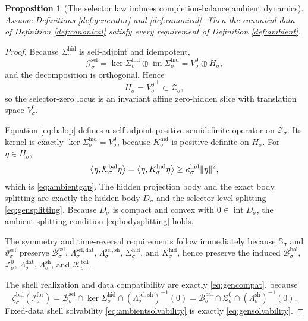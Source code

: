\documentclass[11pt]{article}
\newcommand{\ForSpace}[1]{\mathcal I_{#1}^{\mathrm{for}}}
\newcommand{\BalSpace}[1]{\mathcal Z_{#1}}
\newcommand{\BalBody}[1]{\mathcal B_{#1}^{\mathrm{bal}}}
\newcommand{\BalData}[1]{\Lambda_{#1}^{\mathrm{dat}}}
\newcommand{\BalShell}[1]{\Lambda_{#1}^{\mathrm{sh}}}
\newcommand{\ZeroHiddenSlice}[1]{\mathcal Z_{#1}^{0}}
\newcommand{\ZeroHiddenVec}[1]{V_{#1}^{0}}
\newcommand{\BalOp}[1]{\mathcal K_{#1}^{\mathrm{bal}}}
\newcommand{\BalEmbed}[1]{\zeta_{#1}^{\mathrm{bal}}}
\newcommand{\GapSpace}[1]{H_{#1}}
\newcommand{\GapBody}[1]{D_{#1}}
\newcommand{\HiddenOperator}[1]{K_{#1}^{\mathrm{hid}}}
\newcommand{\GenSpace}[1]{\mathcal G_{#1}^{\mathrm{sel}}}
\newcommand{\GenBody}[1]{\mathcal B_{#1}^{\mathrm{sel}}}
\newcommand{\GenData}[1]{\Lambda_{#1}^{\mathrm{sel,dat}}}
\newcommand{\GenShell}[1]{\Lambda_{#1}^{\mathrm{sel,sh}}}
\newcommand{\HiddenSel}[1]{\Sigma_{#1}^{\mathrm{hid}}}
\newcommand{\GenSym}[1]{\mathbb S_{#1}}
\newcommand{\GenTime}[1]{\vartheta_{#1}^{\mathrm{sel}}}
\newtheorem{proposition}{Proposition}
\begin{document}
\begin{proposition}[The selector law induces completion-balance ambient dynamics]
\label{prop:ambient}
Assume Definitions \ref{def:generator} and \ref{def:canonical}. Then the canonical data of Definition \ref{def:canonical} satisfy every requirement of Definition \ref{def:ambient}.
\end{proposition}

\begin{proof}
Because \(\HiddenSel{\sigma}\) is self-adjoint and idempotent,
\[
\GenSpace{\sigma}
=
\ker\HiddenSel{\sigma}\oplus \operatorname{im}\HiddenSel{\sigma}
=
\ZeroHiddenVec{\sigma}\oplus\GapSpace{\sigma},
\]
and the decomposition is orthogonal. Hence
\[
\GapSpace{\sigma}
=
{\ZeroHiddenVec{\sigma}}^{\perp}\subset\BalSpace{\sigma},
\]
so the selector-zero locus is an invariant affine zero-hidden slice with translation space \(\ZeroHiddenVec{\sigma}\).

Equation \eqref{eq:balop} defines a self-adjoint positive semidefinite operator on \(\BalSpace{\sigma}\). Its kernel is exactly \(\ker\HiddenSel{\sigma}=\ZeroHiddenVec{\sigma}\), because \(\HiddenOperator{\sigma}\) is positive definite on \(\GapSpace{\sigma}\). For \(\eta\in\GapSpace{\sigma}\),
\[
\ev{\eta,\BalOp{\sigma}\eta}
=
\ev{\eta,\HiddenOperator{\sigma}\eta}
\ge
\kappa_{\sigma}^{\mathrm{hid}}\|\eta\|^{2},
\]
which is \eqref{eq:ambientgap}. The hidden projection body and the exact body splitting are exactly the hidden body \(\GapBody{\sigma}\) and the selector-level splitting \eqref{eq:gensplitting}. Because \(\GapBody{\sigma}\) is compact and convex with \(0\in\operatorname{int}\GapBody{\sigma}\), the ambient splitting condition \eqref{eq:bodysplitting} holds.

The symmetry and time-reversal requirements follow immediately because \(\GenSym{\sigma}\) and \(\GenTime{\sigma}\) preserve \(\GenBody{\sigma}\), \(\GenData{\sigma}\), \(\GenShell{\sigma}\), \(\HiddenSel{\sigma}\), and \(\HiddenOperator{\sigma}\), hence preserve the induced \(\BalBody{\sigma}\), \(\ZeroHiddenSlice{\sigma}\), \(\BalData{\sigma}\), \(\BalShell{\sigma}\), and \(\BalOp{\sigma}\).

The shell realization and data compatibility are exactly \eqref{eq:gencompat}, because
\[
\BalEmbed{\sigma}(\ForSpace{\sigma})
=
\GenBody{\sigma}\cap\ker\HiddenSel{\sigma}\cap(\GenShell{\sigma})^{-1}(0)
=
\BalBody{\sigma}\cap\ZeroHiddenSlice{\sigma}\cap(\BalShell{\sigma})^{-1}(0).
\]
Fixed-data shell solvability \eqref{eq:ambientsolvability} is exactly \eqref{eq:gensolvability}.


\end{proof}
\end{document}
